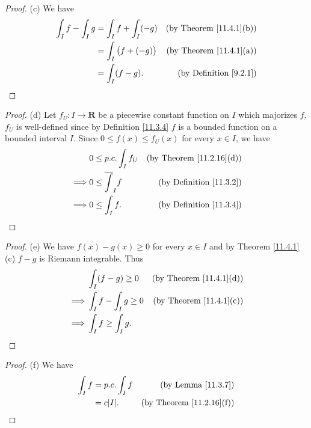 \begin{proof}{(c)}
    We have
    \begin{align*}
        \int_I f - \int_I g & = \int_I f + \int_I (-g)    & \text{(by Theorem \ref{11.4.1}(b))} \\
                            & = \int_I \big(f + (-g)\big) & \text{(by Theorem \ref{11.4.1}(a))} \\
                            & = \int_I (f - g).           & \text{(by Definition \ref{9.2.1})}
    \end{align*}
\end{proof}

\begin{proof}{(d)}
    Let \(f_U : I \to \mathbf{R}\) be a piecewise constant function on \(I\) which majorizes \(f\).
    \(f_U\) is well-defined since by Definition \ref{11.3.4} \(f\) is a bounded function on a bounded interval \(I\).
    Since \(0 \leq f(x) \leq f_U(x)\) for every \(x \in I\), we have
    \begin{align*}
                 & 0 \leq p.c. \int_I f_U     & \text{(by Theorem \ref{11.2.16}(d))} \\
        \implies & 0 \leq \overline{\int}_I f & \text{(by Definition \ref{11.3.2})}  \\
        \implies & 0 \leq \int_I f.           & \text{(by Definition \ref{11.3.4})}
    \end{align*}
\end{proof}

\begin{proof}{(e)}
    We have \(f(x) - g(x) \geq 0\) for every \(x \in I\) and by Theorem \ref{11.4.1}(c) \(f - g\) is Riemann integrable.
    Thus
    \begin{align*}
                 & \int_I (f - g) \geq 0      & \text{(by Theorem \ref{11.4.1}(d))} \\
        \implies & \int_I f - \int_I g \geq 0 & \text{(by Theorem \ref{11.4.1}(c))} \\
        \implies & \int_I f \geq \int_I g.
    \end{align*}
\end{proof}

\begin{proof}{(f)}
    We have
    \begin{align*}
        \int_I f & = p.c. \int_I f & \text{(by Lemma \ref{11.3.7})}       \\
                 & = c \abs*{I}.   & \text{(by Theorem \ref{11.2.16}(f))}
    \end{align*}
\end{proof}


